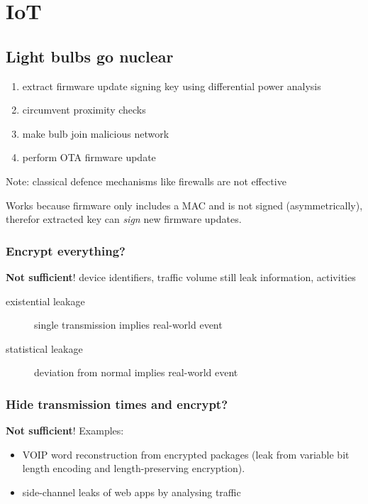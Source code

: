 
\section{IoT}
\subsection{Light bulbs go nuclear}
\begin{enumerate}
    \item extract firmware update signing key using differential power analysis
    \item circumvent proximity checks
    \item make bulb join malicious network
    \item perform OTA firmware update
\end{enumerate}
Note: classical defence mechanisms like firewalls are not effective

Works because firmware only includes a MAC and is not signed (asymmetrically), therefor extracted key can \textit{sign} new firmware updates.

\subsubsection{Encrypt everything?}
\textbf{Not sufficient}! device identifiers, traffic volume still leak information, activities

\begin{description}
    \item[existential leakage] single transmission implies real-world event
    \item[statistical leakage] deviation from normal implies real-world event
\end{description}

\subsubsection{Hide transmission times and encrypt?}
\textbf{Not sufficient}! Examples: 
\begin{itemize}
    \item VOIP word reconstruction from encrypted packages (leak from variable bit length encoding and length-preserving encryption).
    \item side-channel leaks of web apps by analysing traffic
\end{itemize}


